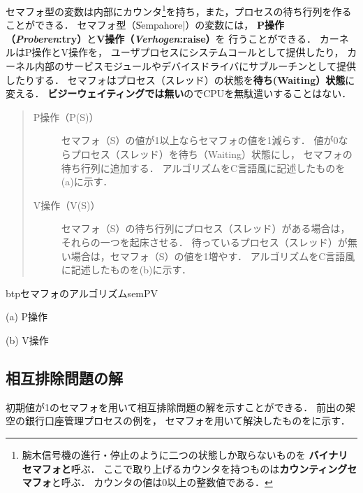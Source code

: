 
セマフォ型の変数は内部にカウンタ\footnote{
腕木信号機の進行・停止のように二つの状態しか取らないものを
{\bf バイナリセマフォと}呼ぶ．
ここで取り上げるカウンタを持つものは{\bf カウンティングセマフォ}と呼ぶ．
カウンタの値は0以上の整数値である．
}を持ち，また，プロセスの待ち行列を作ることができる．
セマフォ型（\|Sempahore|）の変数には，
{\bf P操作（{\it Proberen}:try）}と{\bf V操作（{\it Verhogen}:raise）}を
行うことができる．
カーネルはP操作とV操作を，
ユーザプロセスにシステムコールとして提供したり，
カーネル内部のサービスモジュールやデバイスドライバにサブルーチンとして提供したりする．
セマフォはプロセス（スレッド）の状態を{\bf 待ち(Waiting）状態}に変える．
{\bf ビジーウェイティングでは無い}のでCPUを無駄遣いすることはない．

\begin{quote}
\begin{description}
\item[P操作（P(S)）]
セマフォ（S）の値が1以上ならセマフォの値を1減らす．
値が0ならプロセス（スレッド）を待ち（Waiting）状態にし，
セマフォの待ち行列に追加する．
アルゴリズムをC言語風に記述したものを(a)に示す．
\item[V操作（V(S)）] %
セマフォ（S）の待ち行列にプロセス（スレッド）がある場合は，
それらの一つを起床させる．
待っているプロセス（スレッド）が無い場合は，セマフォ（S）の値を1増やす．
アルゴリズムをC言語風に記述したものを(b)に示す．
\end{description}
\end{quote}

\begin{myfig}{btp}{セマフォのアルゴリズム}{semPV}
\small\begin{center}
\begin{minipage}{0.48\columnwidth}

\centerline{(a) P操作}
\end{minipage}\hspace{1em}
\begin{minipage}{0.48\columnwidth}

\centerline{(b) V操作}
\end{minipage}
\end{center}
\end{myfig}

\subsection{相互排除問題の解}
初期値が1のセマフォを用いて相互排除問題の解を示すことができる．
前出の架空の銀行口座管理プロセスの例を，
セマフォを用いて解決したものをに示す．


